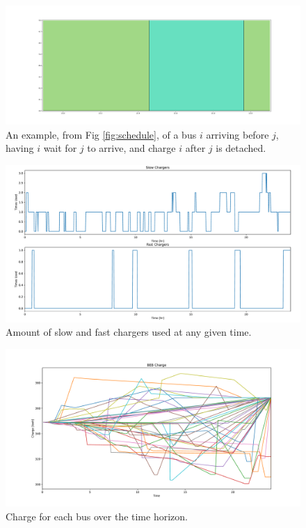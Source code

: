 \documentclass[utf8]{FrontiersinHarvard}
\begin{document}
%
\begin{figure}[htbp]
	\centering
	\includegraphics[trim=0in 0in 0in 0in, width=\linewidth]{unoptimal.pdf}
	\caption{An example, from Fig \ref{fig:schedule}, of a bus $i$ arriving before $j$, having $i$ wait for $j$ to arrive, and charge $i$ after $j$ is detached.}
	\label{fig:unoptimal}
\end{figure}

%
\begin{figure}[htbp]
	\centering
	\includegraphics[trim=0in 0.25in 0in 0.75in, width=\linewidth]{usage.pdf}
	\caption{Amount of slow and fast chargers used at any given time.}
	\label{fig:usage}
\end{figure}

%
\begin{figure}[htbp]
	\centering
	\includegraphics[trim= 0.25in 0in 0.5in 0.25in, width=\linewidth]{charges.pdf}
	\caption{Charge for each bus over the time horizon.}
	\label{fig:charges}
\end{figure}

\end{document}
